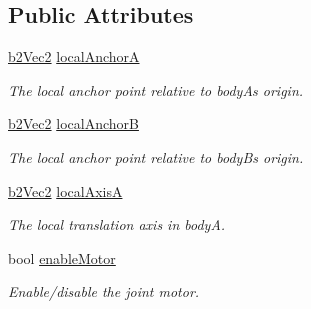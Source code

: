 \subsection*{Public Attributes}
\begin{DoxyCompactItemize}
\item 
\mbox{\label{structb2_wheel_joint_def_a9429d2273bfdd8bdc0db416e73b89ae4}} 
\hyperlink{structb2_vec2}{b2\+Vec2} \hyperlink{structb2_wheel_joint_def_a9429d2273bfdd8bdc0db416e73b89ae4}{local\+AnchorA}
\begin{DoxyCompactList}\small\item\em The local anchor point relative to bodyA\textquotesingle{}s origin. \end{DoxyCompactList}\item 
\mbox{\label{structb2_wheel_joint_def_a88ba0f7108076b9d7ced68425be95c27}} 
\hyperlink{structb2_vec2}{b2\+Vec2} \hyperlink{structb2_wheel_joint_def_a88ba0f7108076b9d7ced68425be95c27}{local\+AnchorB}
\begin{DoxyCompactList}\small\item\em The local anchor point relative to bodyB\textquotesingle{}s origin. \end{DoxyCompactList}\item 
\mbox{\label{structb2_wheel_joint_def_ad635ee7b77b50037dc0e021a0f5c93a6}} 
\hyperlink{structb2_vec2}{b2\+Vec2} \hyperlink{structb2_wheel_joint_def_ad635ee7b77b50037dc0e021a0f5c93a6}{local\+AxisA}
\begin{DoxyCompactList}\small\item\em The local translation axis in bodyA. \end{DoxyCompactList}\item 
\mbox{\label{structb2_wheel_joint_def_a8e7193d6c34c784ffd71e79d3a70acc6}} 
bool \hyperlink{structb2_wheel_joint_def_a8e7193d6c34c784ffd71e79d3a70acc6}{enable\+Motor}
\begin{DoxyCompactList}\small\item\em Enable/disable the joint motor. \end{DoxyCompactList}\item 
\mbox{\label{structb2_wheel_joint_def_ab658ce0fae40c6de09133659f7ffb829}} 

\end{DoxyCompactItemize}
